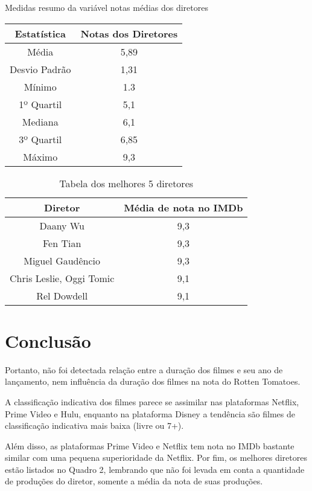 \documentclass[a4paper, 12pt]{article} %
\begin{document}
\begin{quadro}[H]
\centering
\label{quadro_resumo1}
\caption{Medidas resumo da variável notas médias dos diretores}
\begin{tabular}{|c|c|} \hline
\textbf{Estatística} & \textbf{Notas dos Diretores} \\ \hline
Média         & 5,89   \\
Desvio Padrão & 1,31  \\
Mínimo        & 1.3   \\
1º Quartil    & 5,1   \\
Mediana       & 6,1 \\
3º Quartil    & 6,85  \\
Máximo        & 9,3  \\ \hline
\end{tabular}
\label{quadro_resumo2}
\end{quadro}


\begin{table}[H]
\centering
\caption{Tabela dos melhores 5 diretores}
\begin{tabular}{|c|c|} \hline
\textbf{Diretor} & \textbf{Média de nota no IMDb}\\ \hline
Daany Wu        & 9,3  \\
Fen Tian & 9,3 \\
Miguel Gaudêncio      & 9,3 \\
Chris Leslie, Oggi Tomic    & 9,1 \\
Rel Dowdell       & 9,1 \\ \hline
\end{tabular}
\label{Tabela_1}
\end{table}
\newpage
\section{Conclusão}

Portanto, não foi detectada relação entre a duração dos filmes e seu ano de lançamento, nem influência da duração dos filmes na nota do Rotten Tomatoes.

A classificação indicativa dos filmes parece se assimilar nas plataformas Netflix, Prime Video e Hulu, enquanto na plataforma Disney a tendência são filmes de classificação indicativa mais baixa (livre ou 7+).

Além disso, as plataformas Prime Video e Netflix tem nota no IMDb bastante similar com uma pequena superioridade da Netflix. Por fim, os melhores diretores estão listados no Quadro 2, lembrando que não foi levada em conta a quantidade de produções do diretor, somente a média da nota de suas produções. 
\end{document}
